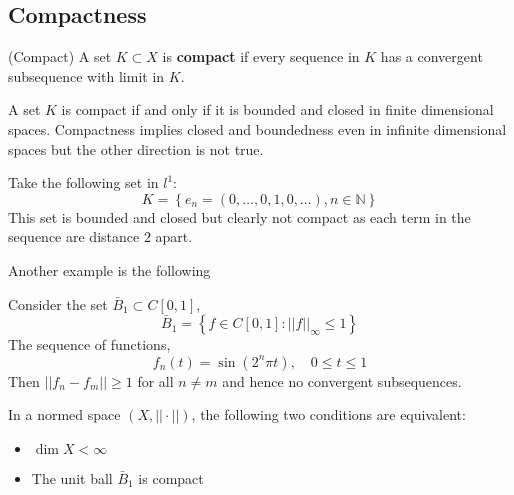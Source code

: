 \documentclass{article}
\begin{document}
\subsection{Compactness}
\begin{defn}
    (Compact) 
    A set $K \subset X$ is \textbf{compact} 
    if every sequence in $K$ has a convergent subsequence with limit in $K$.
\end{defn}  

\begin{remark}
    A set $K$ is compact if and only if it is bounded and closed in finite dimensional spaces.  
    Compactness implies closed and boundedness even in infinite dimensional spaces but the 
    other direction is not true.
\end{remark}  

\begin{eg}
    Take the following set in $l^1$:  
    \begin{equation*}
        K = \left\{ e_n = (0, \ldots, 0, 1, 0, \ldots), n \in \mathbb{N} \right\}
    \end{equation*}  
    This set is bounded and closed but clearly not compact as each term in the sequence
    are distance $2$ apart.  
\end{eg}  

Another example is the following  

\begin{eg}
    Consider the set $\bar{B}_1 \subset C[0,1]$,  
    \begin{equation*}
        \bar{B}_1 = \left\{ f \in C[0,1] : ||f||_{\infty} \leq 1 \right\}
    \end{equation*}  
    The sequence of functions,  
    \begin{equation*}
        f_n(t) = \sin(2^n \pi t), \quad 0 \leq t \leq 1
    \end{equation*}  
    Then $||f_n-f_m||\geq 1$ for all $n \neq m$ and hence no convergent subsequences. 
\end{eg}

\begin{thm}
    In a normed space $(X, ||\cdot||)$, the following two conditions are equivalent:  
    \begin{itemize}
        \item $\dim X < \infty$
        \item The unit ball $\bar{B}_1$ is compact 
    \end{itemize}
\end{thm}  
\end{document}
